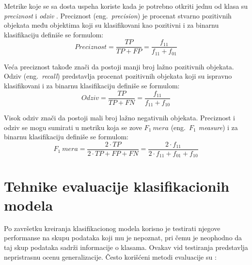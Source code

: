 \documentclass[12pt,oneside]{memoir}
\begin{document}
Metrike koje se sa dosta uspeha koriste kada je potrebno otkriti jednu od klasa su \textit{preciznost} i \textit{odziv} \cite{mitic}. Preciznost (eng.~\textit{precision}) je procenat stvarno pozitivnih objekata među objektima koji su klasifikovani kao pozitivni i za binarnu klasifikaciju definiše se formulom:
$$ \textit{Preciznost} = \frac{TP}{TP+FP} = \frac{f_{11}}{f_{11}+f_{01}} $$

Veća preciznost takođe znači da postoji manji broj lažno pozitivnih objekata. Odziv (eng.~\textit{recall}) predstavlja procenat pozitivnih objekata koji su ispravno klasifikovani i za binarnu klasifikaciju definiše se formulom:
$$ \textit{Odziv} = \frac{TP}{TP+FN} = \frac{f_{11}}{f_{11}+f_{10}} $$ 

Visok odziv znači da postoji mali broj lažno negativnih objekata. Preciznost i odziv se mogu sumirati u metriku koja se zove $F_1\ mera$ (eng.~\textit{$F_1$ measure}) i za binarnu klasifikaciju definiše se formulom:
$$ F_1\ mera = \frac{2 \cdot TP}{2 \cdot TP+FP+FN} = \frac{2 \cdot f_{11}}{2 \cdot f_{11}+f_{01}+f_{10}} $$


\section{Tehnike evaluacije klasifikacionih modela} \label{sec:evaluacija}

Po završetku kreiranja klasifikacionog modela korisno je testirati njegove performanse na skupu podataka koji mu je nepoznat, pri čemu je neophodno da taj skup podataka sadrži informacije o klasama. Ovakav vid testiranja predstavlja nepristrasnu ocenu generalizacije. Često korišćeni metodi evaluacije su  \cite{mitic, mladen, aggarwal, UMLFTA}: 
\end{document}
